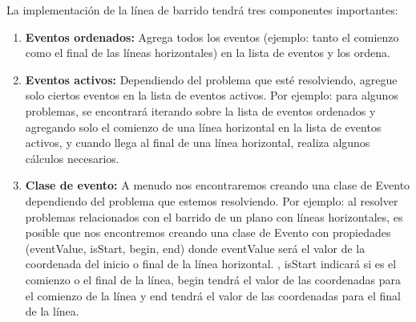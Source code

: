 La implementación de la línea de barrido tendrá tres componentes importantes:

\begin{enumerate}
	\item \textbf{Eventos ordenados:} Agrega todos los eventos (ejemplo: tanto el comienzo como el final de las líneas horizontales) en la lista de eventos y los ordena.
	\item \textbf{Eventos activos:} Dependiendo del problema que esté resolviendo, agregue solo ciertos eventos en la lista de eventos activos. Por ejemplo: para algunos problemas, se encontrará iterando sobre la lista de eventos ordenados y agregando solo el comienzo de una línea horizontal en la lista de eventos activos, y cuando llega al final de una línea horizontal, realiza algunos cálculos necesarios.
	\item \textbf{Clase de evento:} A menudo nos encontraremos creando una clase de Evento dependiendo del problema que estemos resolviendo. Por ejemplo: al resolver problemas relacionados con el barrido de un plano con líneas horizontales, es posible que nos encontremos creando una clase de Evento con propiedades (eventValue, isStart, begin, end) donde eventValue será el valor de la coordenada del inicio o final de la línea horizontal. , isStart indicará si es el comienzo o el final de la línea, begin tendrá el valor de las coordenadas para el comienzo de la línea y end tendrá el valor de las coordenadas para el final de la línea.
\end{enumerate}